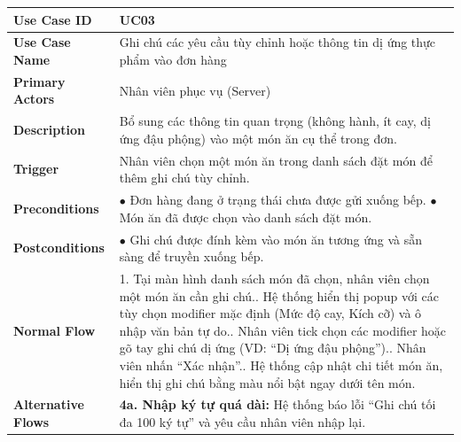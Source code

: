 \begin{longtable}{|p{3.5cm}|p{12.5cm}|}
\hline
\textbf{Use Case ID} & UC03 \\ \hline
\textbf{Use Case Name} & Ghi chú các yêu cầu tùy chỉnh hoặc thông tin dị ứng thực phẩm vào đơn hàng \\ \hline
\textbf{Primary Actors} & Nhân viên phục vụ (Server) \\ \hline
\textbf{Description} & Bổ sung các thông tin quan trọng (không hành, ít cay, dị ứng đậu phộng) vào một món ăn cụ thể trong đơn. \\ \hline
\textbf{Trigger} & Nhân viên chọn một món ăn trong danh sách đặt món để thêm ghi chú tùy chỉnh. \\ \hline
\textbf{Preconditions} &
$\bullet$ Đơn hàng đang ở trạng thái chưa được gửi xuống bếp.\newline
$\bullet$ Món ăn đã được chọn vào danh sách đặt món. \\ \hline
\textbf{Postconditions} & $\bullet$ Ghi chú được đính kèm vào món ăn tương ứng và sẵn sàng để truyền xuống bếp. \\ \hline
\textbf{Normal Flow} &
1. Tại màn hình danh sách món đã chọn, nhân viên chọn một món ăn cần ghi chú.\newline
2. Hệ thống hiển thị popup với các tùy chọn modifier mặc định (Mức độ cay, Kích cỡ) và ô nhập văn bản tự do.\newline
3. Nhân viên tick chọn các modifier hoặc gõ tay ghi chú dị ứng (VD: ``Dị ứng đậu phộng'').\newline
4. Nhân viên nhấn ``Xác nhận''.\newline
5. Hệ thống cập nhật chi tiết món ăn, hiển thị ghi chú bằng màu nổi bật ngay dưới tên món. \\ \hline
\textbf{Alternative Flows} &
\textbf{4a. Nhập ký tự quá dài:} Hệ thống báo lỗi ``Ghi chú tối đa 100 ký tự'' và yêu cầu nhân viên nhập lại. \\ \hline
\end{longtable}

